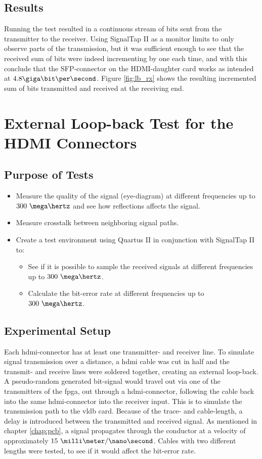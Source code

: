 \documentclass[main.tex]{subfiles}
\begin{document}
\subsection{Results}
Running the test resulted in a continuous stream of bits sent from the transmitter to the receiver. Using SignalTap II as a monitor limits to only observe parts of the transmission, but it was sufficient enough to see that the received sum of bits were indeed incrementing by one each time, and with this conclude that the SFP-connector on the HDMI-daughter card works as intended at $4.8 \giga\bit\per\second$. Figure \ref{fig:lb_rx} shows the resulting incremented sum of bits transmitted and received at the receiving end.


\section{External Loop-back Test for the HDMI Connectors}

\subsection{Purpose of Tests}

\begin{itemize}\setlength{\itemsep}{10pt}
\item Measure the quality of the signal (eye-diagram) at different frequencies up to $300~\mega\hertz$ and see how reflections affects the signal.
\item Measure crosstalk between neighboring signal paths.
\item Create a test environment using Quartus II in conjunction with SignalTap II to:
\begin{itemize}\setlength{\itemsep}{10pt}
  \item See if it is possible to sample the received signals at different frequencies up to $300~\mega\hertz$.
  \item Calculate the bit-error rate at different frequencies up to $300~\mega\hertz$.
\end{itemize}
\end{itemize}

\subsection{Experimental Setup}

Each \gls{hdmi}-connector has at least one transmitter- and receiver line. To simulate signal transmission over a distance, a \gls{hdmi} cable was cut in half and the transmit- and receive lines were soldered together, creating an external loop-back. A pseudo-random generated bit-signal would travel out via one of the transmitters of the \gls{fpga}, out through a \gls{hdmi}-connector, following the cable back into the same \gls{hdmi}-connector into the receiver input. This is to simulate the transmission path to the \gls{vldb} card. Because of the trace- and cable-length, a delay is introduced between the transmitted and received signal. As mentioned in chapter \ref{chap:pcb}, a signal propagates through the conductor at a velocity of approximately $15\ \milli\meter/\nano\second$. Cables with two different lengths were tested, to see if it would affect the bit-error rate.
\end{document}
